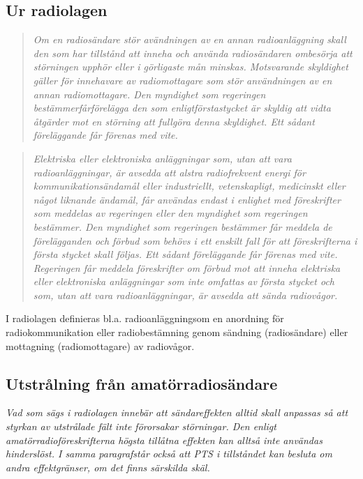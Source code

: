 \subsection{Ur radiolagen}

\begin{quote}
\emph{Om en radiosändare stör avändningen av en annan radioanläggning
  skall den som har tillstånd att inneha och använda radiosändaren
  ombesörja att störningen upphör eller i görligaste mån
  minskas. Motsvarande skyldighet gäller för innehavare av
  radiomottagare som stör användningen av en annan radiomottagare.
  Den myndighet som regeringen bestämmerfårförelägga den som
  enligtförstastycket är skyldig att vidta åtgärder mot en störning
  att fullgöra denna skyldighet. Ett sådant föreläggande får förenas
  med vite.}
\end{quote}
\begin{quote}
\emph{Elektriska eller elektroniska anläggningar som, utan att vara
  radioanläggningar, är avsedda att alstra radiofrekvent energi för
  kommunikationsändamål eller industriellt, vetenskapligt, medicinskt
  eller något liknande ändamål, får användas endast i enlighet med
  föreskrifter som meddelas av regeringen eller den myndighet som
  regeringen bestämmer.  Den myndighet som regeringen bestämmer får
  meddela de förelägganden och förbud som behövs i ett enskilt fall
  för att föreskrifterna i första stycket skall följas. Ett sådant
  föreläggande får förenas med vite.  Regeringen får meddela
  föreskrifter om förbud mot att inneha elektriska eller elektroniska
  anläggningar som inte omfattas av första stycket och som, utan att
  vara radioanläggningar, är avsedda att sända radiovågor.}
\end{quote}

I radiolagen definieras bl.a. radioanläggningsom en anordning för
radiokommunikation eller radiobestämning genom sändning (radiosändare)
eller mottagning (radiomottagare) av radiovågor.

\subsection{Utstrålning från amatörradiosändare}

\emph{Vad som sägs i radiolagen innebär att sändareffekten alltid
  skall anpassas så att styrkan av utstrålade fält inte förorsakar
  störningar. Den enligt amatörradioföreskrifterna högsta tillåtna
  effekten kan alltså inte användas hinderslöst. I samma paragrafstår
  också att PTS i tillståndet kan besluta om andra effektgränser, om
  det finns särskilda skäl.}

